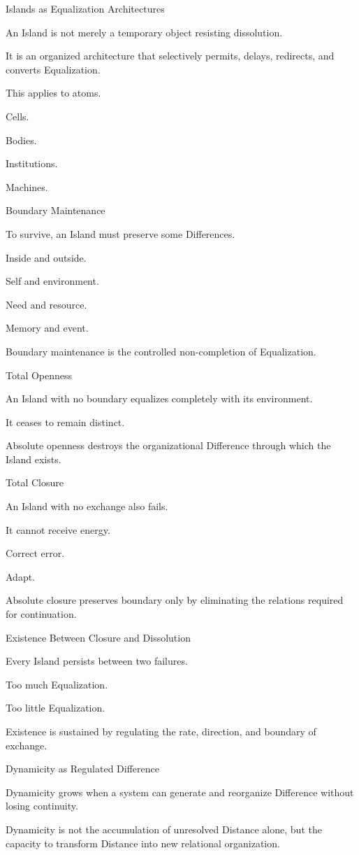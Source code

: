 Islands as Equalization Architectures

An Island is not merely a temporary object resisting dissolution.

It is an organized architecture that selectively permits, delays, redirects, and converts Equalization.

This applies to atoms.

Cells.

Bodies.

Institutions.

Machines.

Boundary Maintenance

To survive, an Island must preserve some Differences.

Inside and outside.

Self and environment.

Need and resource.

Memory and event.

Boundary maintenance is the controlled non-completion of Equalization.

Total Openness

An Island with no boundary equalizes completely with its environment.

It ceases to remain distinct.

Absolute openness destroys the organizational Difference through which the Island exists.

Total Closure

An Island with no exchange also fails.

It cannot receive energy.

Correct error.

Adapt.

Absolute closure preserves boundary only by eliminating the relations required for continuation.

Existence Between Closure and Dissolution

Every Island persists between two failures.

Too much Equalization.

Too little Equalization.

Existence is sustained by regulating the rate, direction, and boundary of exchange.

Dynamicity as Regulated Difference

Dynamicity grows when a system can generate and reorganize Difference without losing continuity.

Dynamicity is not the accumulation of unresolved Distance alone, but the capacity to transform Distance into new relational organization.

